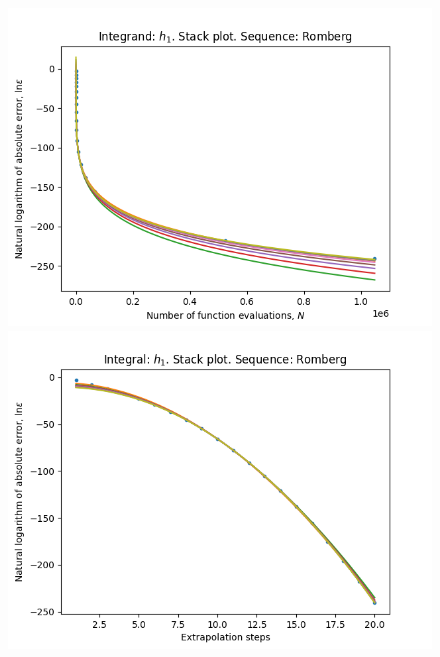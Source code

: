 \begin{figure}[H]
\centering
\begin{minipage}{0.45\textwidth}
\centering
\includegraphics[scale=0.45]{../results/romberg_plots/h_one_hp_romberg_stack.png}
\end{minipage}
\begin{minipage}{0.45\textwidth}
\centering
\includegraphics[scale=0.45]{../results/romberg_plots/h_one_hp_romberg_steps_stack.png}
\end{minipage}
\end{figure}


